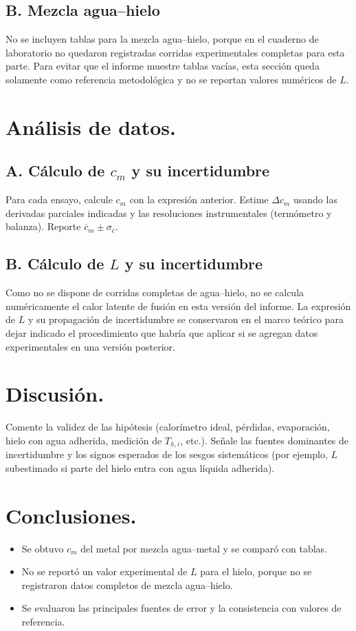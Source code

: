 \documentclass[11pt,twocolumn]{article}
\begin{document}
\subsection*{B. Mezcla agua--hielo}
No se incluyen tablas para la mezcla agua--hielo, porque en el cuaderno de laboratorio no quedaron registradas corridas experimentales completas para esta parte. Para evitar que el informe muestre tablas vacías, esta sección queda solamente como referencia metodológica y no se reportan valores numéricos de $L$.

\section{Análisis de datos.}
\subsection*{A. Cálculo de $c_m$ y su incertidumbre}
Para cada ensayo, calcule $c_m$ con la expresión anterior. Estime $\Delta c_m$ usando las derivadas parciales
indicadas y las resoluciones instrumentales (termómetro y balanza). Reporte $\overline{c}_m \pm \sigma_{\overline{c}}$.

\subsection*{B. Cálculo de $L$ y su incertidumbre}
Como no se dispone de corridas completas de agua--hielo, no se calcula numéricamente el calor latente de fusión en esta versión del informe. La expresión de $L$ y su propagación de incertidumbre se conservaron en el marco teórico para dejar indicado el procedimiento que habría que aplicar si se agregan datos experimentales en una versión posterior.

\section{Discusión.}
Comente la validez de las hipótesis (calorímetro ideal, pérdidas, evaporación, hielo con agua adherida,
medición de $T_{h,i}$, etc.). Señale las fuentes dominantes de incertidumbre y los signos esperados de los
sesgos sistemáticos (por ejemplo, $L$ subestimado si parte del hielo entra con agua líquida adherida).

\section{Conclusiones.}
\begin{itemize}
    \item Se obtuvo $c_m$ del metal por mezcla agua–metal y se comparó con tablas.
    \item No se reportó un valor experimental de $L$ para el hielo, porque no se registraron datos completos de mezcla agua--hielo.
    \item Se evaluaron las principales fuentes de error y la consistencia con valores de referencia.
\end{itemize}
\end{document}
